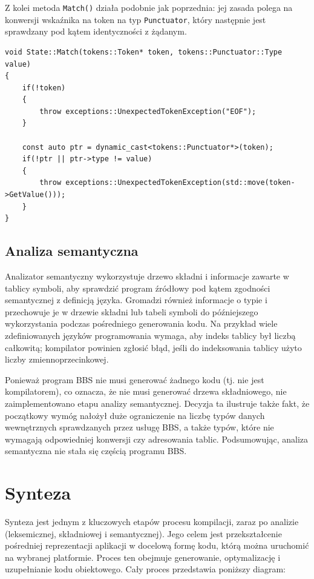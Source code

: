 Z kolei metoda \texttt{Match()} działa podobnie jak poprzednia: jej zasada polega na konwersji wskaźnika na token na typ \texttt{Punctuator}, który następnie jest sprawdzany pod kątem identyczności z żądanym.

\begin{lstlisting}[label=list:match,caption=Metoda State::Match(),basicstyle=\footnotesize\ttfamily]
void State::Match(tokens::Token* token, tokens::Punctuator::Type value)
{
    if(!token)
    {
        throw exceptions::UnexpectedTokenException("EOF");
    }
    
    const auto ptr = dynamic_cast<tokens::Punctuator*>(token);
    if(!ptr || ptr->type != value)
    {
        throw exceptions::UnexpectedTokenException(std::move(token->GetValue()));
    }
}
\end{lstlisting}

\subsection{Analiza semantyczna}

Analizator semantyczny wykorzystuje drzewo składni i informacje zawarte w tablicy symboli, aby sprawdzić program źródłowy pod kątem zgodności semantycznej z definicją języka. Gromadzi również informacje o typie i przechowuje je w drzewie składni lub tabeli symboli do późniejszego wykorzystania podczas pośredniego generowania kodu.
Na przykład wiele zdefiniowanych języków programowania wymaga, aby indeks tablicy był liczbą całkowitą; kompilator powinien zgłosić błąd, jeśli do indeksowania tablicy użyto liczby zmiennoprzecinkowej.

Ponieważ program BBS nie musi generować żadnego kodu (tj. nie jest kompilatorem), co oznacza, że nie musi generować drzewa składniowego, nie zaimplementowano etapu analizy semantycznej. Decyzja ta ilustruje także fakt, że początkowy wymóg nałożył duże ograniczenie na liczbę typów danych wewnętrznych sprawdzanych przez usługę BBS, a także typów, które nie wymagają odpowiedniej konwersji czy adresowania tablic. Podsumowując, analiza semantyczna nie stała się częścią programu BBS.

\section{Synteza}
Synteza jest jednym z kluczowych etapów procesu kompilacji, zaraz po analizie (leksemicznej, składniowej i semantycznej). Jego celem jest przekształcenie pośredniej reprezentacji aplikacji w docelową formę kodu, którą można uruchomić na wybranej platformie. Proces ten obejmuje generowanie, optymalizację i uzupełnianie kodu obiektowego. Cały proces przedstawia poniższy diagram:

